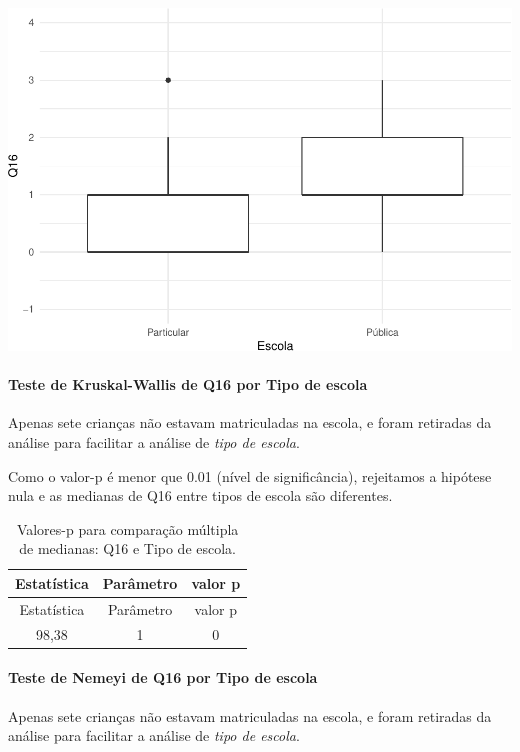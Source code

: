 \documentclass[]{article}
\let\oldparagraph\paragraph
\renewcommand{\paragraph}[1]{\oldparagraph{#1}\mbox{}}
\begin{document}
\begin{center}\includegraphics[width=0.75\linewidth]{relatorio_covid19_files/figure-latex/unnamed-chunk-175-1} \end{center}

\hypertarget{teste-de-kruskal-wallis-de-q16-por-tipo-de-escola}{%
\paragraph{Teste de Kruskal-Wallis de Q16 por Tipo de escola}\label{teste-de-kruskal-wallis-de-q16-por-tipo-de-escola}}

Apenas sete crianças não estavam matriculadas na escola, e foram retiradas da análise para facilitar a análise de \emph{tipo de escola}.

Como o valor-p é menor que 0.01 (nível de significância), rejeitamos a hipótese nula e as medianas de Q16 entre tipos de escola são diferentes.

\begin{longtable}[]{@{}ccc@{}}
\caption{\label{tab:unnamed-chunk-177}Valores-p para comparação múltipla de medianas: Q16 e Tipo de escola.}\tabularnewline
\toprule
Estatística & Parâmetro & valor p\tabularnewline
\midrule
\endfirsthead
\toprule
Estatística & Parâmetro & valor p\tabularnewline
\midrule
\endhead
98,38 & 1 & 0\tabularnewline
\bottomrule
\end{longtable}

\hypertarget{teste-de-nemeyi-de-q16-por-tipo-de-escola}{%
\paragraph{Teste de Nemeyi de Q16 por Tipo de escola}\label{teste-de-nemeyi-de-q16-por-tipo-de-escola}}

Apenas sete crianças não estavam matriculadas na escola, e foram retiradas da análise para facilitar a análise de \emph{tipo de escola}.
\end{document}
